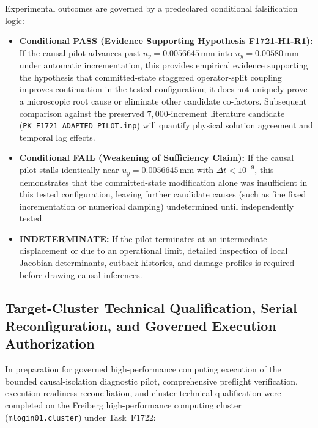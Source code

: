 Experimental outcomes are governed by a predeclared conditional falsification logic:
\begin{itemize}
  \item \textbf{Conditional PASS (Evidence Supporting Hypothesis F1721-H1-R1):} If the causal pilot advances past $u_y = 0.0056645\,\mathrm{mm}$ into $u_y = 0.00580\,\mathrm{mm}$ under automatic incrementation, this provides empirical evidence supporting the hypothesis that committed-state staggered operator-split coupling improves continuation in the tested configuration; it does not uniquely prove a microscopic root cause or eliminate other candidate co-factors. Subsequent comparison against the preserved $7{,}000$-increment literature candidate (\texttt{PK\_F1721\_ADAPTED\_PILOT.inp}) will quantify physical solution agreement and temporal lag effects.
  \item \textbf{Conditional FAIL (Weakening of Sufficiency Claim):} If the causal pilot stalls identically near $u_y = 0.0056645\,\mathrm{mm}$ with $\Delta t < 10^{-9}$, this demonstrates that the committed-state modification alone was insufficient in this tested configuration, leaving further candidate causes (such as fine fixed incrementation or numerical damping) undetermined until independently tested.
  \item \textbf{INDETERMINATE:} If the pilot terminates at an intermediate displacement or due to an operational limit, detailed inspection of local Jacobian determinants, cutback histories, and damage profiles is required before drawing causal inferences.
\end{itemize}

\subsection{Target-Cluster Technical Qualification, Serial Reconfiguration, and Governed Execution Authorization}
\label{subsec:f1722_cluster_qualification}

In preparation for governed high-performance computing execution of the bounded causal-isolation diagnostic pilot, comprehensive preflight verification, execution readiness reconciliation, and cluster technical qualification were completed on the Freiberg high-performance computing cluster (\texttt{mlogin01.cluster}) under Task~F1722:

